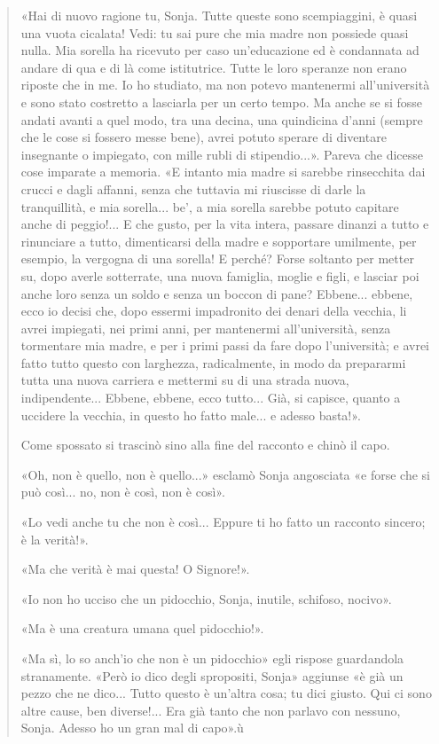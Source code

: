 \documentclass{book}
\begin{document}
\begin{quote}
«Hai di nuovo ragione tu, Sonja. Tutte queste sono scempiaggini, è quasi una vuota cicalata!
Vedi: tu sai pure che mia madre non possiede quasi nulla. Mia sorella ha ricevuto per caso
un'educazione ed è condannata ad andare di qua e di là come istitutrice. Tutte le loro speranze
non erano riposte che in me. Io ho studiato, ma non potevo mantenermi all'università e sono
stato costretto a lasciarla per un certo tempo. Ma anche se si fosse andati avanti a quel modo, tra una decina, una quindicina d'anni (sempre che le cose si fossero messe bene), avrei potuto
sperare di diventare insegnante o impiegato, con mille rubli di stipendio...». Pareva che dicesse
cose imparate a memoria. «E intanto mia madre si sarebbe rinsecchita dai crucci e dagli affanni,
senza che tuttavia mi riuscisse di darle la tranquillità, e mia sorella... be’, a mia sorella sarebbe
potuto capitare anche di peggio!... E che gusto, per la vita intera, passare dinanzi a tutto e
rinunciare a tutto, dimenticarsi della madre e sopportare umilmente, per esempio, la vergogna
di una sorella! E perché? Forse soltanto per metter su, dopo averle sotterrate, una nuova
famiglia, moglie e figli, e lasciar poi anche loro senza un soldo e senza un boccon di pane?
Ebbene... ebbene, ecco io decisi che, dopo essermi impadronito dei denari della vecchia, li avrei
impiegati, nei primi anni, per mantenermi all'università, senza tormentare mia madre, e per i
primi passi da fare dopo l'università; e avrei fatto tutto questo con larghezza, radicalmente, in
modo da prepararmi tutta una nuova carriera e mettermi su di una strada nuova,
indipendente... Ebbene, ebbene, ecco tutto... Già, si capisce, quanto a uccidere la vecchia, in
questo ho fatto male... e adesso basta!».

Come spossato si trascinò sino alla fine del racconto e chinò il capo.

«Oh, non è quello, non è quello...» esclamò Sonja angosciata «e forse che si può così... no, non
è così, non è così».

«Lo vedi anche tu che non è così... Eppure ti ho fatto un racconto sincero; è la verità!».

«Ma che verità è mai questa! O Signore!».

«Io non ho ucciso che un pidocchio, Sonja, inutile, schifoso, nocivo».

«Ma è una creatura umana quel pidocchio!».

«Ma sì, lo so anch'io che non è un pidocchio» egli rispose guardandola stranamente. «Però io
dico degli spropositi, Sonja» aggiunse «è già un pezzo che ne dico... Tutto questo è un'altra
cosa; tu dici giusto. Qui ci sono altre cause, ben diverse!... Era già tanto che non parlavo con
nessuno, Sonja. Adesso ho un gran mal di capo».ù


\end{quote}
\end{document}
